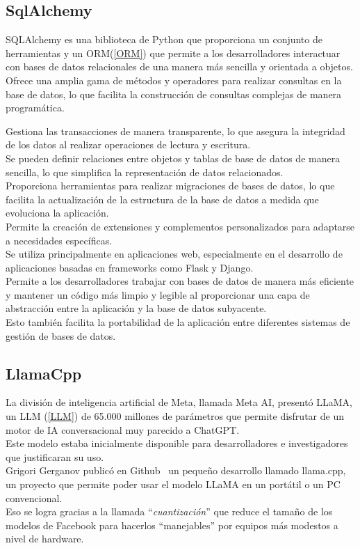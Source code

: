 \subsection{SqlAlchemy~\cite{bayer2012sqlalchemy}}
SQLAlchemy es una biblioteca de Python que proporciona un conjunto de herramientas y
 un ORM(\ref{ORM}) que permite a los desarrolladores interactuar 
con bases de datos relacionales de una manera más sencilla y orientada a objetos.\\

Ofrece una amplia gama de métodos y operadores para realizar consultas en la base de datos, 
lo que facilita la construcción de consultas complejas de manera programática.

Gestiona las transacciones de manera transparente, lo que asegura la integridad 
de los datos al realizar operaciones de lectura y escritura.\\
Se pueden definir relaciones entre objetos y tablas de base de datos de manera sencilla,
 lo que simplifica la representación de datos relacionados.\\
Proporciona herramientas para realizar migraciones de bases de datos, 
lo que facilita la actualización de la estructura de la base de datos a medida 
que evoluciona la aplicación.\\
Permite la creación de extensiones y complementos personalizados 
para adaptarse a necesidades específicas.\\
Se utiliza principalmente en aplicaciones web, 
especialmente en el desarrollo de aplicaciones basadas en frameworks como Flask y Django. \\
Permite a los desarrolladores trabajar con bases de datos de manera más eficiente y 
mantener un código más limpio y legible al proporcionar una capa de abstracción entre la 
aplicación y la base de datos subyacente.\\ 
Esto también facilita la portabilidad de la aplicación entre diferentes sistemas de 
gestión de bases de datos.\\

\subsection{LlamaCpp~\cite{metallamaLM}}
La división de inteligencia artificial de Meta, llamada Meta AI, presentó LLaMA, un LLM (\ref{LLM}) de 
65.000 millones de parámetros que permite disfrutar de un motor de 
IA conversacional muy parecido a ChatGPT.\\
Este modelo estaba inicialmente disponible para desarrolladores e investigadores 
que justificaran su uso.\\
Grigori Gerganov publicó en Github~\cite{gerganovllamaCpp} un pequeño desarrollo llamado llama.cpp,
un proyecto que permite poder usar el modelo LLaMA en un portátil o un PC convencional.\\ 
Eso se logra gracias a la llamada ``\emph{cuantización}'' que reduce el tamaño de los modelos de 
Facebook para hacerlos ``manejables'' por equipos más modestos a nivel de hardware.

